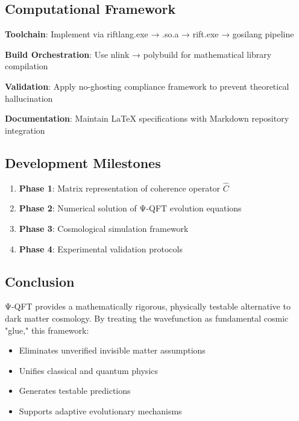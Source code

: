 \documentclass{article}
\begin{document}
\begin{tcolorbox}[colback=blue!5!white,colframe=blue!75!black,title=Coherence Operator]
\begin{tcolorbox}[title={Executive Summary - OBINexus Framework},obinexus]
\begin{tcolorbox}[title={Core Premise (Technical)},theory]
\begin{tcolorbox}[title={Experimental Protocol},math]
\subsection{Computational Framework}

\begin{tcolorbox}[title={Aegis Project Integration},obinexus]
\textbf{Toolchain}: Implement via riftlang.exe → .so.a → rift.exe → gosilang pipeline

\textbf{Build Orchestration}: Use nlink → polybuild for mathematical library compilation

\textbf{Validation}: Apply no-ghosting compliance framework to prevent theoretical hallucination

\textbf{Documentation}: Maintain LaTeX specifications with Markdown repository integration


\subsection{Development Milestones}

\begin{enumerate}
\item \textbf{Phase 1}: Matrix representation of coherence operator $\hat{C}$
\item \textbf{Phase 2}: Numerical solution of Ψ-QFT evolution equations
\item \textbf{Phase 3}: Cosmological simulation framework  
\item \textbf{Phase 4}: Experimental validation protocols
\end{enumerate}

\section{Conclusion}

\begin{tcolorbox}[title={Strategic Impact},theory]
Ψ-QFT provides a mathematically rigorous, physically testable alternative to dark matter cosmology. By treating the wavefunction as fundamental cosmic "glue," this framework:

\begin{itemize}
\item Eliminates unverified invisible matter assumptions
\item Unifies classical and quantum physics
\item Generates testable predictions
\item Supports adaptive evolutionary mechanisms
\end{itemize}


\end{tcolorbox}
\end{tcolorbox}
\end{tcolorbox}
\end{tcolorbox}
\end{tcolorbox}
\end{tcolorbox}
\end{document}
